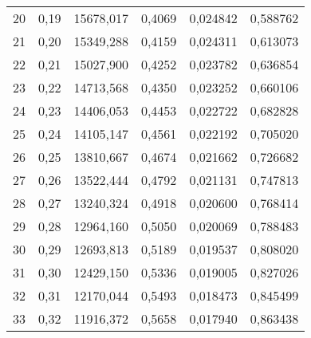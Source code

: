 \begin{exemple}
\begin{center}
\begin{tabular}{S[table-format=2.0]S[table-format=1.2]
    	                S[table-format=5.3]S[table-format=1.4]
    	            	S[table-format=1.6]S[table-format=1.6]}
    	20  &  0,19  &  15678,017  &  0,4069  &  0,024842  &  0,588762 \\
    	21  &  0,20  &  15349,288  &  0,4159  &  0,024311  &  0,613073 \\
    	22  &  0,21  &  15027,900  &  0,4252  &  0,023782  &  0,636854 \\
    	23  &  0,22  &  14713,568  &  0,4350  &  0,023252  &  0,660106 \\
    	24  &  0,23  &  14406,053  &  0,4453  &  0,022722  &  0,682828 \\
    	25  &  0,24  &  14105,147  &  0,4561  &  0,022192  &  0,705020 \\
    	26  &  0,25  &  13810,667  &  0,4674  &  0,021662  &  0,726682 \\
    	27  &  0,26  &  13522,444  &  0,4792  &  0,021131  &  0,747813 \\
    	28  &  0,27  &  13240,324  &  0,4918  &  0,020600  &  0,768414 \\
    	29  &  0,28  &  12964,160  &  0,5050  &  0,020069  &  0,788483 \\
    	30  &  0,29  &  12693,813  &  0,5189  &  0,019537  &  0,808020 \\
    	31  &  0,30  &  12429,150  &  0,5336  &  0,019005  &  0,827026 \\
    	32  &  0,31  &  12170,044  &  0,5493  &  0,018473  &  0,845499 \\
    	33  &  0,32  &  11916,372  &  0,5658  &  0,017940  &  0,863438 \\
    	\midrule
    	\end{tabular}
	\end{center}
    	

\end{exemple}
